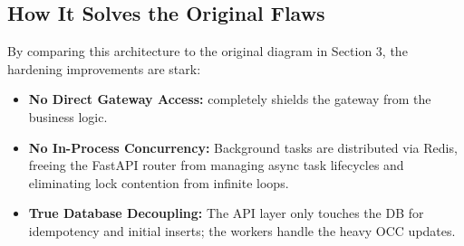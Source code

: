 \vspace{0.8cm}

\subsection{How It Solves the Original Flaws}

By comparing this architecture to the original diagram in Section 3, the hardening improvements are stark:

\begin{tcolorbox}[featurebox={Architectural Improvements}]
\begin{itemize}
    \item \textbf{No Direct Gateway Access:}  completely shields the gateway from the business logic.
    \item \textbf{No In-Process Concurrency:} Background tasks are distributed via Redis, freeing the FastAPI router from managing async task lifecycles and eliminating lock contention from infinite loops.
    \item \textbf{True Database Decoupling:} The API layer only touches the DB for idempotency and initial inserts; the workers handle the heavy OCC updates.
\end{itemize}
\end{tcolorbox}
